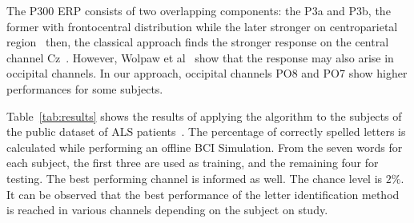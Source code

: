 \documentclass[entropy,article,submit,moreauthors,pdftex,10pt,a4paper]{mdpi}
\begin{document}
%

The P300 ERP  consists of two overlapping components: the P3a and P3b, the former with frontocentral distribution while the later stronger on centroparietal region~\citep{Polich2007} then, the classical approach finds the stronger response on the central channel Cz~\citep{Riccio2013}. However, Wolpaw et al~\citep{Krusienski2006} show that the response may also arise in occipital channels.  In our approach, occipital channels PO8 and PO7 show higher performances for some subjects. %


Table~\ref{tab:results} shows the results of applying the algorithm to the subjects of the public dataset of ALS patients~\citep{Riccio2013}. The percentage of correctly spelled letters is calculated while performing an offline BCI Simulation.  From the seven words for each subject, the first three are used as training, and the remaining four for testing.  The best performing channel is informed as well. The chance level is $2\%$.  It can be observed that the best performance of the letter identification method is reached in various channels depending on the subject on study. 
\end{document}
